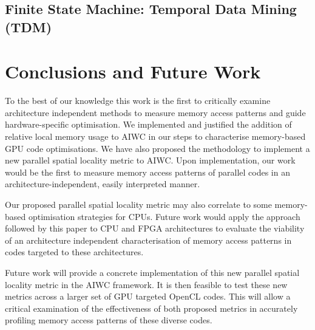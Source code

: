 \documentclass[review=false, sigchi]{acmart}
\begin{document}
	\subsection{Finite State Machine: Temporal Data Mining (TDM)}
	
	
	\section{Conclusions and Future Work} \label{future work}
	
	To the best of our knowledge this work is the first to critically examine architecture independent methods to measure memory access patterns and guide hardware-specific optimisation. We implemented and justified the addition of relative local memory usage to AIWC in our steps to characterise memory-based GPU code optimisations. We have also proposed the methodology to implement a new parallel spatial locality metric to AIWC. Upon implementation, our work would be the first to measure memory access patterns of parallel codes in an architecture-independent, easily interpreted manner.
	
	Our proposed parallel spatial locality metric may also correlate to some memory-based optimisation strategies for CPUs. Future work would apply the approach followed by this paper to CPU and FPGA architectures to evaluate the viability of an architecture independent characterisation of memory access patterns in codes targeted to these architectures.
	
	Future work will provide a concrete implementation of this new parallel spatial locality metric in the AIWC framework. It is then feasible to test these new metrics across a larger set of GPU targeted OpenCL codes. This will allow a critical examination of the effectiveness of both proposed metrics in accurately profiling memory access patterns of these diverse codes.

	
	
	
\end{document}
